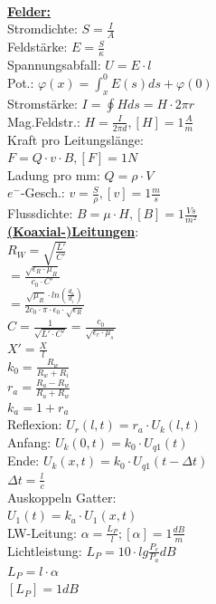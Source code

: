 \documentclass[11pt]{article}
\begin{document}
~~~~~~~
\begin{minipage}{0.33\textwidth}

\underline{\textbf{Felder:}}\\
Stromdichte: $S=\frac{I}{A}$\\
Feldstärke: $E=\frac{S}{\kappa}$\\
Spannungsabfall: $U=E \cdot l$\\
Pot.: $\varphi (x)= \int_x^0 E(s)ds + \varphi(0)$\\
Stromstärke: $I = \oint H ds = H \cdot 2\pi r$\\
Mag.Feldstr.: $H = \frac{I}{2\pi d}, [H] = 1\frac{A}{m}$\\
Kraft pro Leitungslänge:\\
\phantom{ss} $F=Q \cdot v \cdot B, [F] = 1N$\\
Ladung pro mm: $Q = \rho \cdot V$\\
$e^-$-Gesch.: $v = \frac{S}{\rho}, [v] = 1\frac{m}{s}$\\
Flussdichte: $B=\mu \cdot H, [B] = 1 \frac{Vs}{m^2}$\\
 
 \underline{\textbf{(Koaxial-)Leitungen}}:\\
$R_W = \sqrt{\frac{L'}{C'}}$\\
    \phantom{sssi} $=\frac{\sqrt{\epsilon_R \cdot \mu_R}}{c_0 \cdot C'}$\\
    \phantom{sssi} $=\frac{\sqrt{\mu_R} \cdot ln(\frac{d_a}{d_i})}{2c_0 \cdot \pi \cdot \epsilon_0 \cdot \sqrt{\epsilon_R}}$\\
$C = \frac{1}{\sqrt{L' \cdot C'}} = \frac{c_0}{\sqrt{\epsilon_r \cdot \mu_s}}$\\
$X' = \frac{X}{l}$\\

$k_0 = \frac{R_w}{R_w + R_i} $\\
$r_a = \frac{R_a - R_w}{R_a + R_w} $\\
$k_a = 1 + r_a$\\
Reflexion: $U_r(l,t) = r_a \cdot U_k(l,t)$\\
Anfang: $U_k(0,t)=k_0 \cdot U_{q1}(t)$\\
Ende: $U_k(x,t)= k_0 \cdot U_{q1}(t-\Delta t)$\\
$\Delta t = \frac{l}{c}$\\
Auskoppeln Gatter:\\
\phantom{ss} $U_1(t) = k_a \cdot U_1(x,t)$\\

LW-Leitung: $\alpha = \frac{L_P}{l}; [\alpha] = 1 \frac{dB}{m}$\\
Lichtleistung: $L_P = 10 \cdot lg\frac{P_e}{P_a} dB$\\
\phantom{sssssississsssss} $L_P = l \cdot \alpha$\\
\phantom{sssssississsssss}$ [L_P] = 1dB$\\



\end{minipage}%
\end{document}
